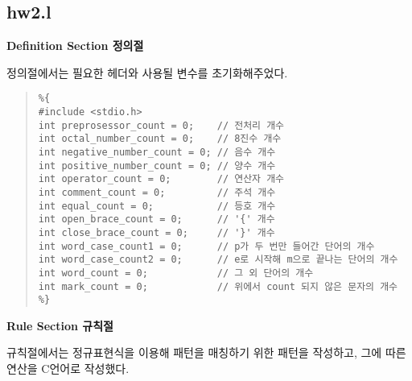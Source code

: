 \documentclass{article}
\begin{document}
\subsection{hw2.l}
\begin{normalsize}
\textbf{Definition Section 정의절} \\
\end{normalsize}
정의절에서는 필요한 헤더와 사용될 변수를 초기화해주었다. \\
\begin{quote}
\begin{verbatim}
%{
#include <stdio.h>
int preprosessor_count = 0;    // 전처리 개수
int octal_number_count = 0;    // 8진수 개수
int negative_number_count = 0; // 음수 개수
int positive_number_count = 0; // 양수 개수
int operator_count = 0;        // 연산자 개수
int comment_count = 0;         // 주석 개수
int equal_count = 0;           // 등호 개수
int open_brace_count = 0;      // '{' 개수
int close_brace_count = 0;     // '}' 개수
int word_case_count1 = 0;      // p가 두 번만 들어간 단어의 개수
int word_case_count2 = 0;      // e로 시작해 m으로 끝나는 단어의 개수
int word_count = 0;            // 그 외 단어의 개수
int mark_count = 0;            // 위에서 count 되지 않은 문자의 개수
%}

\end{verbatim}
\end{quote}

\noindent
\begin{normalsize}
\textbf{Rule Section 규칙절} \\
\end{normalsize}
규칙절에서는 정규표현식을 이용해 패턴을 매칭하기 위한 패턴을 작성하고, 그에 따른 연산을 C언어로 작성했다. \\
\end{document}

